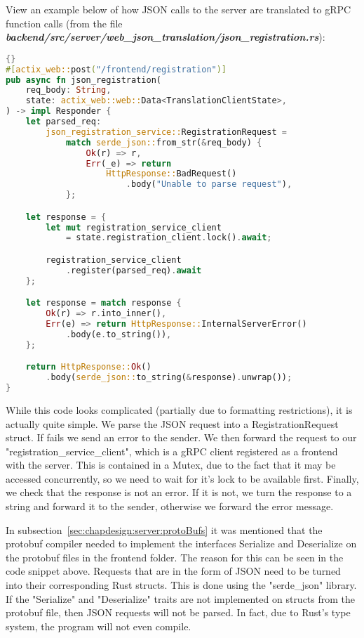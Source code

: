 View an example below of how JSON calls to the server are translated to gRPC function calls (from the file \textit{\textbf{backend/src/server/web\_json\_translation/json\_registration.rs}}): 
\begin{lstlisting}[language=Rust, style=boxed, showstringspaces=false]{}
#[actix_web::post("/frontend/registration")]
pub async fn json_registration(
    req_body: String,
    state: actix_web::web::Data<TranslationClientState>,
) -> impl Responder {
    let parsed_req: 
        json_registration_service::RegistrationRequest =
            match serde_json::from_str(&req_body) {
                Ok(r) => r,
                Err(_e) => return 
                    HttpResponse::BadRequest()
                        .body("Unable to parse request"),
            };

    let response = {
        let mut registration_service_client 
            = state.registration_client.lock().await;

        registration_service_client
            .register(parsed_req).await
    };

    let response = match response {
        Ok(r) => r.into_inner(),
        Err(e) => return HttpResponse::InternalServerError()
            .body(e.to_string()),
    };

    return HttpResponse::Ok()
        .body(serde_json::to_string(&response).unwrap());
}
\end{lstlisting}
While this code looks complicated (partially due to formatting restrictions), it is actually quite simple. We parse the JSON request into a RegistrationRequest struct. If fails we send an error to the sender. We then forward the request to our "registration\_service\_client", which is a gRPC client registered as a frontend with the server. This is contained in a Mutex, due to the fact that it may be accessed concurrently, so we need to wait for it's lock to be available first. Finally, we check that the response is not an error. If it is not, we turn the response to a string and forward it to the sender, otherwise we forward the error message.

In subsection~\ref{sec:chapdesign:server:protoBufs} it was mentioned that the protobuf compiler needed to implement the interfaces Serialize and Deserialize on the protobuf files in the frontend folder. The reason for this can be seen in the code snippet above. Requests that are in the form of JSON need to be turned into their corresponding Rust structs. This is done using the "serde\_json" library. If the "Serialize" and "Deserialize" traits are not implemented on structs from the protobuf file, then JSON requests will not be parsed. In fact, due to Rust's type system, the program will not even compile.

